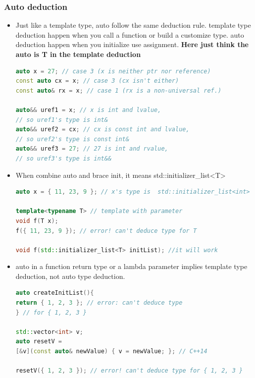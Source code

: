 \documentclass[a4paper,12pt,twoside]{book}
\begin{document}
\subsubsection{Auto deduction}
\begin{itemize}
\item Just like a template type, auto follow the same deduction rule. template type deduction happen when you call a function or build a customize type. auto deduction happen when you initialize use assignment. \textbf{Here  just think the auto is T in the template deduction}

\begin{lstlisting}[frame=single, language=c++]
auto x = 27; // case 3 (x is neither ptr nor reference)
const auto cx = x; // case 3 (cx isn't either)
const auto& rx = x; // case 1 (rx is a non-universal ref.)

auto&& uref1 = x; // x is int and lvalue,
// so uref1's type is int&
auto&& uref2 = cx; // cx is const int and lvalue,
// so uref2's type is const int&
auto&& uref3 = 27; // 27 is int and rvalue,
// so uref3's type is int&&
\end{lstlisting}

\item When combine auto and brace init, it means std::initializer\_list<T>
\begin{lstlisting}[frame=single, language=c++]
auto x = { 11, 23, 9 }; // x's type is  std::initializer_list<int>

template<typename T> // template with parameter
void f(T x);
f({ 11, 23, 9 }); // error! can't deduce type for T

void f(std::initializer_list<T> initList); //it will work
\end{lstlisting}

\item auto in a function return type or a lambda parameter implies template type deduction, not auto type deduction.
\begin{lstlisting}[frame=single, language=c++]
auto createInitList(){
return { 1, 2, 3 }; // error: can't deduce type
} // for { 1, 2, 3 }

std::vector<int> v;
auto resetV =
[&v](const auto& newValue) { v = newValue; }; // C++14

resetV({ 1, 2, 3 }); // error! can't deduce type for { 1, 2, 3 }
\end{lstlisting}
\end{itemize}
\end{document}
